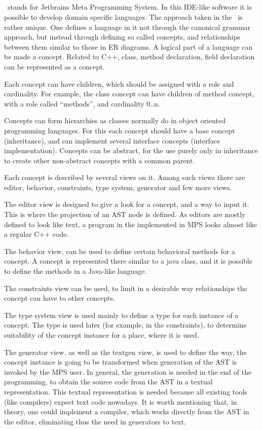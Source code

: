\subsection{\jbmps}

\jbmps\ stands for Jetbrains Meta Programming System. In this IDE-like software it is possible to develop domain specific languages.
The approach taken in the \jbmps\ is rather unique. One defines a language in it not through the canonical grammar approach, but instead
through defining so called concepts, and relationships between them similar to those in ER diagrams. A logical part of a language can be made 
a concept. Related to C++, class, method declaration, field declaration can be represented as a concept. 

Each concept can have children, which should be assigned with a role and cardinality. For example, the class concept can have children of method concept,
with a role called ``methods'', and cardinality 0..n.

Concepts can form hierarchies as classes normally do in object oriented programming languages. For this each concept should have a base concept (inheritance),
and can implement several interface concepts (interface implementation). Concepts can be abstract, for the use purely only in inheritance to create other 
non-abstract concepts with a common parent.

Each concept is described by several views on it. Among such views there are editor, behavior, constraints, type system, generator and few more views.

The editor view is designed to give a look for a concept, and a way to input it. This is where the projection of an AST node is defined. As editors 
are mostly defined to look like text, a program in the \cpppl implemented in MPS looks almost like a regular C++ code.

The behavior view, can be used to define certain behavioral methods for a concept. A concept is represented there similar to a java class, and
it is possible to define the methods in a Java-like language.

The constraints view can be used, to limit in a desirable way relationships the concept can have to other concepts.

The type system view is used mainly to define a type for each instance of a concept. The type is used later (for example, in the constraints), to 
determine suitability of the concept instance for a place, where it is used.

The generator view, as well as the textgen view, is used to define the way, the concept instance is going to be transformed when generation of the AST
is invoked by the MPS user. In general, the generation is needed in the end of the programming, to obtain the source code from the AST in a textual representation.
This textual representation is needed because all existing tools (like compilers) expect text code nowadays. It is worth mentioning that, in theory, one
could implement a compiler, which works directly from the AST in the editor, eliminating thus the need in generators to text.

